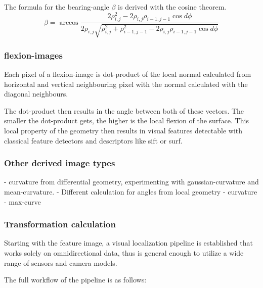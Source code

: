 \documentclass[doktyp=marbeit,fontsize=12pt,sprache=english,draft=true,hausschrift=true]{TUBAFarbeiten}
\begin{document}
The formula for the \gls{bearing-angle} $\beta$ is derived with the cosine theorem.
\[
    \beta = \arccos \frac{2 \rho_{i,j}^2 - 2 \rho_{i,j} \rho_{i-1,j-1} \cos d\phi}{2 \rho_{i,j} \sqrt{\rho_{i,j}^2 + \rho_{i-1,j-1}^2 - 2 \rho_{i,j} \rho_{i-1,j-1} \cos d\phi}}
\]

\subsubsection{\Glspl{flexion-image}}

Each pixel of a \Gls{flexion-image} is dot-product of the local normal
calculated from horizontal and vertical neighbouring pixel with the
normal calculated with the diagonal neighbours.

The dot-product then results in the angle between both of these vectors.
The smaller the dot-product gets, the higher is the local flexion of the
surface. This local property of the geometry then results in visual
features detectable with classical feature detectors and descriptors like
\Gls{sift} or \Gls{surf}.

\subsubsection{Other derived image types}

- \gls{curvature} from differential geometry, experimenting with \gls{gaussian-curvature} and \gls{mean-curvature}.
- Different calculation for angles from local geometry
- curvature
- max-curve

\subsubsection{Transformation calculation}\label{transformation-calculation}

Starting with the feature image, a visual localization pipeline is
established that works solely on omnidirectional data, thus is general
enough to utilize a wide range of sensors and camera models.

The full workflow of the pipeline is as follows:
\end{document}
